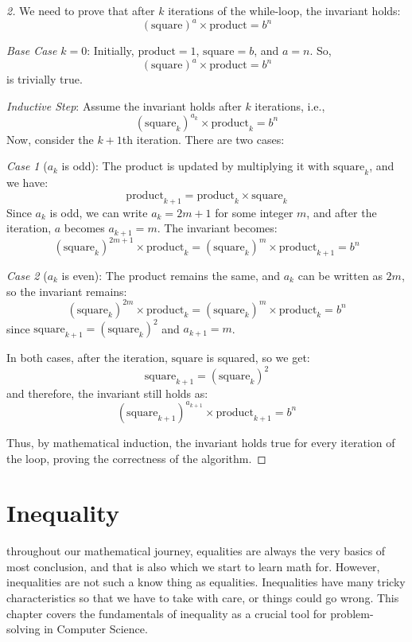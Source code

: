 \documentclass[
	12pt, %
	fleqn, %
	a4paper, %
]{LegrandOrangeBook}
\begin{document}
\begin{proof}[2]
    We need to prove that after \(k\) iterations of the while-loop, the invariant holds:
\[
(\text{square})^a \times \text{product} = b^n
\]

\textit{Base Case} \(k=0\):
Initially, \(\text{product} = 1\), \(\text{square} = b\), and \(a = n\). So,
\[
(\text{square})^a \times \text{product} = b^n
\]
is trivially true.

\textit{Inductive Step}:
Assume the invariant holds after \(k\) iterations, i.e.,
\[
(\text{square}_k)^{a_k} \times \text{product}_k = b^n
\]
Now, consider the \(k+1\)th iteration. There are two cases:

\textit{Case 1} (\(a_k\) is odd):
The product is updated by multiplying it with \(\text{square}_k\), and we have:
\[
\text{product}_{k+1} = \text{product}_k \times \text{square}_k
\]
Since \(a_k\) is odd, we can write \(a_k = 2m + 1\) for some integer \(m\), and after the iteration, \(a\) becomes \(a_{k+1} = m\). The invariant becomes:
\[
(\text{square}_k)^{2m+1} \times \text{product}_k = (\text{square}_k)^m \times \text{product}_{k+1} = b^n
\]

\textit{Case 2} (\(a_k\) is even):
The product remains the same, and \(a_k\) can be written as \(2m\), so the invariant remains:
\[
(\text{square}_k)^{2m} \times \text{product}_k = (\text{square}_k)^m \times \text{product}_k = b^n
\]
since \(\text{square}_{k+1} = (\text{square}_k)^2\) and \(a_{k+1} = m\).

In both cases, after the iteration, \(\text{square}\) is squared, so we get:
\[
\text{square}_{k+1} = (\text{square}_k)^2
\]
and therefore, the invariant still holds as:
\[
(\text{square}_{k+1})^{a_{k+1}} \times \text{product}_{k+1} = b^n
\]

Thus, by mathematical induction, the invariant holds true for every iteration of the loop, proving the correctness of the algorithm.
\end{proof}



\chapterspaceabove{6.75cm} 
\chapterspacebelow{7.25cm} 
\chapter{Inequality}
throughout our mathematical journey, equalities are always the very basics of most conclusion, and that is also which we start to learn math for. However, inequalities are not such a know thing as equalities.
Inequalities have many tricky characteristics so that we have to take with care, or things could go wrong. This chapter covers the fundamentals of inequality as a crucial tool for problem-solving in Computer Science.
\end{document}
